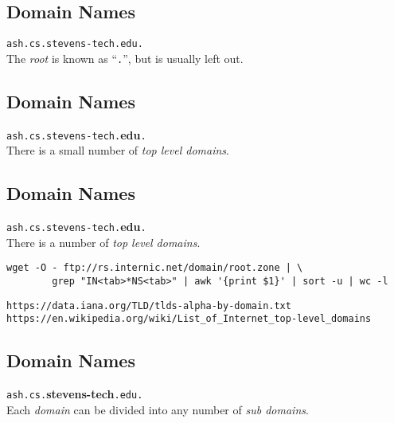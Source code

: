 \documentclass[xga]{xdvislides}
\begin{document}
\subsection{Domain Names}
\vspace{.5in}
\begin{center}
	\Huge
	\verb+ash.cs.stevens-tech.edu.+ \\
	\vspace{.5in}
	The {\em root} is known as ``\verb+.+'', but is usually left out.
\end{center}
\Normalsize

\subsection{Domain Names}
\vspace{.5in}
\begin{center}
	\Huge
	\verb+ash.cs.stevens-tech.+{\bf edu}\verb+.+ \\
	\vspace{.5in}
	There is a small number of {\em top level domains}.
\end{center}
\Normalsize

\subsection{Domain Names}
\vspace{.5in}
\begin{center}
	\Huge
	\verb+ash.cs.stevens-tech.+{\bf edu}\verb+.+ \\
	\vspace{.5in}
	There is a number of {\em top level domains}. \\
	\vspace{.5in}
	\Normalsize
	\begin{verbatim}
wget -O - ftp://rs.internic.net/domain/root.zone | \
        grep "IN<tab>*NS<tab>" | awk '{print $1}' | sort -u | wc -l
\end{verbatim}
	\vspace{.25in}
	\verb+https://data.iana.org/TLD/tlds-alpha-by-domain.txt+ \\
	\verb+https://en.wikipedia.org/wiki/List_of_Internet_top-level_domains+
\end{center}
\Normalsize


\subsection{Domain Names}
\vspace{.5in}
\begin{center}
	\Huge
	\verb+ash.cs.+{\bf stevens-tech}\verb+.edu.+ \\
	\vspace{.5in}
	Each {\em domain} can be divided into any number of {\em sub domains}.
\end{center}
\Normalsize
\end{document}
